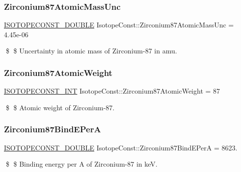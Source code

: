 \subsubsection{\texorpdfstring{Zirconium87\+Atomic\+Mass\+Unc}{Zirconium87AtomicMassUnc}}
{\footnotesize\ttfamily \mbox{\hyperlink{group___isotope_const-_macros_ga8f45a7272ce02c0b4c65c44636ed719a}{I\+S\+O\+T\+O\+P\+E\+C\+O\+N\+S\+T\+\_\+\+D\+O\+U\+B\+LE}} Isotope\+Const\+::\+Zirconium87\+Atomic\+Mass\+Unc = 4.\+45e-\/06}

\$ \$ Uncertainty in atomic mass of Zirconium-\/87 in amu. \mbox{\label{group___isotope_const-_zirconium-_zr87_ga6dc3fdedac5e0e308f00f1f77ee427d1}} 
\subsubsection{\texorpdfstring{Zirconium87\+Atomic\+Weight}{Zirconium87AtomicWeight}}
{\footnotesize\ttfamily \mbox{\hyperlink{group___isotope_const-_macros_ga5f18360b3e99483a35c32d789e62621c}{I\+S\+O\+T\+O\+P\+E\+C\+O\+N\+S\+T\+\_\+\+I\+NT}} Isotope\+Const\+::\+Zirconium87\+Atomic\+Weight = 87}

\$ \$ Atomic weight of Zirconium-\/87. \mbox{\label{group___isotope_const-_zirconium-_zr87_ga74a05a7d1f8e59e5a1466c7975eaebdb}} 
\subsubsection{\texorpdfstring{Zirconium87\+Bind\+E\+PerA}{Zirconium87BindEPerA}}
{\footnotesize\ttfamily \mbox{\hyperlink{group___isotope_const-_macros_ga8f45a7272ce02c0b4c65c44636ed719a}{I\+S\+O\+T\+O\+P\+E\+C\+O\+N\+S\+T\+\_\+\+D\+O\+U\+B\+LE}} Isotope\+Const\+::\+Zirconium87\+Bind\+E\+PerA = 8623.}

\$ \$ Binding energy per A of Zirconium-\/87 in keV. \mbox{\label{group___isotope_const-_zirconium-_zr87_ga2b9f2ce301857bd0256a0602dded69b8}} 
